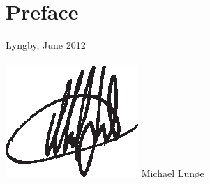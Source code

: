 \chapter{Preface}
%
%

\vspace{20mm}
\mbox{}\hfill
\begin{minipage}[t]{80mm}
  Lyngby, June 2012
  \\ \\
  \mbox{} \hspace{-16mm} \includegraphics{img/signature.eps}
  Michael Lunøe
\end{minipage}
